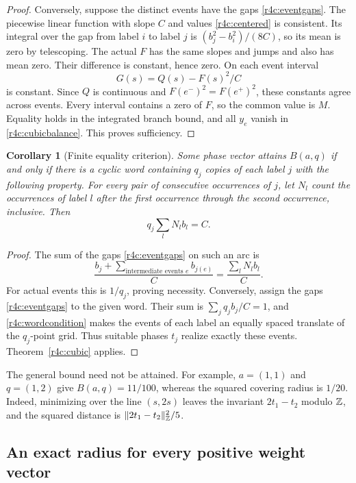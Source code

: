 \documentclass[11pt,a4paper]{article}
\newtheorem{corollary}[theorem]{Corollary}
\theoremstyle{definition}\newtheorem{definition}[theorem]{Definition}
\theoremstyle{remark}\newtheorem{remark}[theorem]{Remark}
\numberwithin{equation}{section}
\begin{document}
\begin{proof}
Conversely, suppose the distinct events have the gaps
\eqref{r4c:eventgaps}.  The piecewise linear function with slope $C$
and values \eqref{r4c:centered} is consistent.  Its integral over the
gap from label $i$ to label $j$ is $(b_j^2-b_i^2)/(8C)$, so its
mean is zero by telescoping.  The actual $F$ has the same slopes and
jumps and also has mean zero.  Their difference is constant, hence
zero.  On each event interval
\[
 G(s)=Q(s)-F(s)^2/C
\]
is constant.  Since $Q$ is continuous and $F(e^-)^2=F(e^+)^2$,
these constants agree across events.  Every interval contains a zero
of $F$, so the common value is $M$.  Equality holds in the integrated
branch bound, and all $y_e$ vanish in \eqref{r4c:cubicbalance}.
This proves sufficiency.
\end{proof}

\begin{corollary}[Finite equality criterion]\label{r4c:word}
Some phase vector attains $B(a,q)$ if and only if there is a cyclic
word containing $q_j$ copies of each label $j$ with the following
property.  For every pair of consecutive occurrences of $j$, let
$N_l$ count the occurrences of label $l$ after the first occurrence
through the second occurrence, inclusive.  Then
\begin{equation}\label{r4c:wordcondition}
 q_j\sum_lN_lb_l=C.
\end{equation}
\end{corollary}

\begin{proof}
The sum of the gaps \eqref{r4c:eventgaps} on such an arc is
\[
 \frac{b_j+\sum_{\text{intermediate events }e}b_{j(e)}}{C}
   =\frac{\sum_lN_lb_l}{C}.
\]
For actual events this is $1/q_j$, proving necessity.
Conversely, assign the gaps \eqref{r4c:eventgaps} to the given word.
Their sum is $\sum_jq_jb_j/C=1$, and
\eqref{r4c:wordcondition} makes the events of each label an equally
spaced translate of the $q_j$-point grid.  Thus suitable phases
$t_j$ realize exactly these events.  Theorem~\ref{r4c:cubic} applies.
\end{proof}

The general bound need not be attained.  For example,
$a=(1,1)$ and $q=(1,2)$ give $B(a,q)=11/100$, whereas the squared
covering radius is $1/20$.  Indeed, minimizing over the line
$(s,2s)$ leaves the invariant $2t_1-t_2$ modulo $\mathbb Z$, and the squared
distance is $\|2t_1-t_2\|_{\mathbb Z}^2/5$.

\subsection{An exact radius for every positive weight vector}
\end{document}
